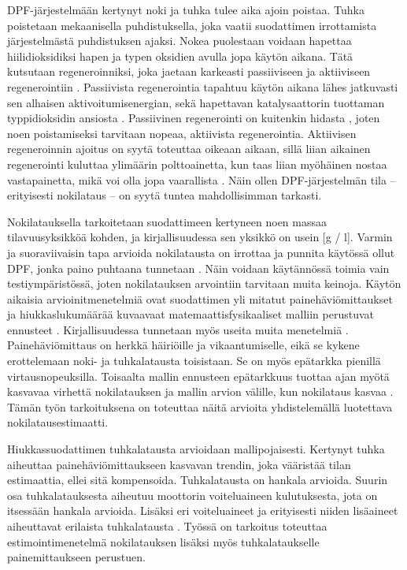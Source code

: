 DPF-järjestelmään kertynyt noki ja tuhka tulee aika ajoin poistaa. Tuhka poistetaan mekaanisella puhdistuksella, joka vaatii suodattimen irrottamista järjestelmästä puhdistuksen ajaksi. Nokea puolestaan voidaan hapettaa hiilidioksidiksi hapen ja typen oksidien avulla jopa käytön aikana. Tätä kutsutaan regeneroinniksi, joka jaetaan karkeasti passiiviseen ja aktiiviseen regenerointiin \cite{Yan_state_of_the_art}.
Passiivista regenerointia tapahtuu käytön aikana lähes jatkuvasti sen alhaisen aktivoitumisenergian, sekä hapettavan katalysaattorin tuottaman typpidioksidin ansiosta \cite{Yan_state_of_the_art}. Passiivinen regenerointi on kuitenkin hidasta \cite{YaoDongwei2023Rodm}, joten noen poistamiseksi tarvitaan nopeaa, aktiivista regenerointia.
Aktiivisen regeneroinnin ajoitus on syytä toteuttaa oikeaan aikaan, sillä liian aikainen regenerointi kuluttaa ylimäärin polttoainetta, kun taas liian myöhäinen nostaa vastapainetta, mikä voi olla jopa vaarallista \cite{YaoDongwei2023Rodm}. 
Näin ollen DPF-järjestelmän tila -- erityisesti nokilataus -- on syytä tuntea mahdollisimman tarkasti. 

Nokilatauksella tarkoitetaan suodattimeen kertyneen noen massaa tilavuusyksikköä kohden, ja kirjallisuudessa sen yksikkö on usein [g / l]. Varmin ja suoraviivaisin tapa arvioida nokilatausta on irrottaa ja punnita käytössä ollut DPF, jonka paino puhtaana tunnetaan \cite{Yan_state_of_the_art}. Näin voidaan käytännössä toimia vain testiympäristössä, joten nokilatauksen arvointiin tarvitaan muita keinoja.
Käytön aikaisia arvioinitmenetelmiä ovat suodattimen yli mitatut painehäviömittaukset ja hiukkaslukumäärää kuvaavaat matemaattisfysikaaliset malliin perustuvat ennusteet \cite{YaoDongwei2023Rodm}. 
Kirjallisuudessa tunnetaan myös useita muita menetelmiä \cite{Yan_state_of_the_art}\cite{dieselnet_sensors_soot}. 
Painehäviömittaus on herkkä häiriöille ja vikaantumiselle, eikä se kykene erottelemaan noki- ja tuhkalatausta toisistaan. Se on myös epätarkka pienillä virtausnopeuksilla.
Toisaalta mallin ennusteen epätarkkuus tuottaa ajan myötä kasvavaa virhettä nokilatauksen ja mallin arvion välille, kun nokilataus kasvaa \cite{YaoDongwei2023Rodm}.
Tämän työn tarkoituksena on toteuttaa näitä arvioita yhdistelemällä luotettava nokilatausestimaatti. 

Hiukkassuodattimen tuhkalatausta arvioidaan mallipojaisesti. 
Kertynyt tuhka aiheuttaa painehäviömittaukseen kasvavan trendin, joka vääristää tilan estimaattia, ellei sitä kompensoida. Tuhkalatausta on hankala arvioida. Suurin osa tuhkalatauksesta aiheutuu moottorin voiteluaineen kulutuksesta, jota on itsessään hankala arvioida. Lisäksi eri voiteluaineet ja erityisesti niiden lisäaineet aiheuttavat erilaista tuhkalatausta \cite{dieselnet_ash} \cite{WangHaohao2019Adid}.
Työssä on tarkoitus toteuttaa estimointimenetelmä nokilatauksen lisäksi myös tuhkalataukselle painemittaukseen perustuen.

